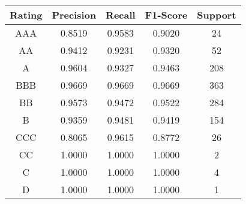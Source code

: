 \footnotesize
\begin{tabular}{ccccc}
\toprule
Rating & Precision & Recall & F1-Score & Support \\
\midrule
AAA & 0.8519 & 0.9583 & 0.9020 & 24 \\
AA & 0.9412 & 0.9231 & 0.9320 & 52 \\
A & 0.9604 & 0.9327 & 0.9463 & 208 \\
BBB & 0.9669 & 0.9669 & 0.9669 & 363 \\
BB & 0.9573 & 0.9472 & 0.9522 & 284 \\
B & 0.9359 & 0.9481 & 0.9419 & 154 \\
CCC & 0.8065 & 0.9615 & 0.8772 & 26 \\
CC & 1.0000 & 1.0000 & 1.0000 & 2 \\
C & 1.0000 & 1.0000 & 1.0000 & 4 \\
D & 1.0000 & 1.0000 & 1.0000 & 1 \\
\bottomrule
\end{tabular}

\normalsize